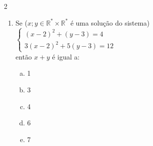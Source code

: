 \documentclass[a4paper,14pt]{article}
\begin{document}
\begin{multicols}{2}
\begin{enumerate}
\begin{enumerate}[a)]
                \item $\begin{cases}
                	-7u + 4v = 1 \\
                	2u - 3v^2 = -1
                \end{cases}$ \\\\\\\\\\\\\\\\\\\\\\\\\\\\\\
	    	\end{enumerate}
    	    \item Se ($x; y \in \mathbb{R}^* \times \mathbb{R}^*$ é uma solução do sistema)\\
    	    $\begin{cases}
    	    	(x - 2)^2 + (y - 3) = 4 \\
    	    	3(x - 2)^2 + 5(y - 3) = 12
    	    \end{cases}$ \\
            então $x + y$ é igual a: \\
            \begin{enumerate}[a)]
            	\item 1
            	\item 3
            	\item 4
            	\item 6
            	\item 7
            \end{enumerate}
		\end{enumerate}

\end{multicols}
\end{document}
